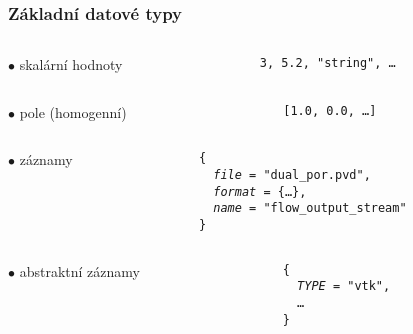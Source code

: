 \documentclass{beamer}
\begin{document}
\begin{frame}
	\frametitle{Základní datové typy}
	\begin{columns}[c]
		\begin{column}{0.35\textwidth}
			$\bullet$ skalární hodnoty
		\end{column}
		\begin{column}{0.65\textwidth}
			\texttt{3, 5.2, "string", \dots}
		\end{column}
	\end{columns}
	\vspace{5mm}
	\begin{columns}[c]
		\begin{column}{0.35\textwidth}
			$\bullet$ pole (homogenní)
		\end{column}
		\begin{column}{0.65\textwidth}
			\texttt{[1.0, 0.0, \dots]}
		\end{column}
	\end{columns}
	\vspace{5mm}
	\begin{columns}[c]
		\begin{column}{0.35\textwidth}
			$\bullet$ záznamy
		\end{column}
		\begin{column}{0.65\textwidth}
	       \texttt{\{} \\
	        \texttt{~~\textit{file} = "dual\_por.pvd",} \\
	        \texttt{~~\textit{format} = \{\dots\},} \\
	        \texttt{~~\textit{name} = "flow\_output\_stream"} \\
	      \texttt{\}}
		\end{column}
	\end{columns}
	\vspace{5mm}
	\begin{columns}[c]
		\begin{column}{0.35\textwidth}
			$\bullet$ abstraktní záznamy
		\end{column}
		\begin{column}{0.65\textwidth}
	       \texttt{\{} \\
	        \texttt{~~\textit{TYPE} = "vtk",} \\
	        \texttt{~~\dots} \\
	      \texttt{\}}
		\end{column}
	\end{columns}
\end{frame}
\end{document}
